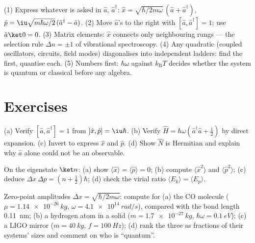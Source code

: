 \begin{method}\label{met:b3:harmonic-oscillator:method}
(1) Express whatever is asked in $\hat a$, $\hat a^\dagger$: $\hat x
= \sqrt{\hbar/2m\omega}\,(\hat a + \hat a^\dagger)$, $\hat p =
\iu\sqrt{m\hbar\omega/2}\,(\hat a^\dagger - \hat a)$. (2) Move
$\hat a$'s to the right with $[\hat a, \hat a^\dagger] = 1$; use
$\hat a\ket0 = 0$. (3) Matrix elements: $\hat x$ connects only
neighbouring rungs --- the selection rule $\Delta n = \pm1$ of
vibrational spectroscopy. (4) Any quadratic  (coupled
oscillators, circuits, field modes) diagonalises into independent
ladders: find the  first, quantise each. (5) Numbers
first: $\hbar\omega$ against $k_{\text{B}}T$ decides whether the
system is quantum or classical before any algebra.
\end{method}

\section{Exercises}

\begin{exercise}[$\star$]\label{exo:b3:harmonic-oscillator:1}
(a) Verify $[\hat a, \hat a^\dagger] = 1$ from $[\hat x, \hat p] =
\iu\hbar$. (b) Verify $\hat H = \hbar\omega(\hat a^\dagger\hat a +
\tfrac12)$ by direct expansion. (c) Invert to express $\hat x$ and
$\hat p$. (d) Show $\hat N$ is Hermitian and explain why $\hat a$
alone could not be an observable.
\end{exercise}

\begin{exercise}[$\star$]\label{exo:b3:harmonic-oscillator:2}
On the eigenstate $\ket n$: (a) show $\langle\hat x\rangle =
\langle\hat p\rangle = 0$; (b) compute $\langle\hat x^2\rangle$ and
$\langle\hat p^2\rangle$; (c) deduce $\Delta x\,\Delta p = (n +
\tfrac12)\hbar$; (d) check the virial ratio $\langle E_k\rangle =
\langle E_p\rangle$.
\end{exercise}

\begin{exercise}[$\star$]\label{exo:b3:harmonic-oscillator:3}
Zero-point amplitudes $\Delta x = \sqrt{\hbar/2m\omega}$: compute
for (a) the CO molecule ($\mu = \qty{1.14e-26}{kg}$, $\omega =
\qty{4.1e14}{rad/s}$), compared with the bond length
\qty{0.11}{nm}; (b) a hydrogen atom in a solid ($m =
\qty{1.7e-27}{kg}$, $\hbar\omega = \qty{0.1}{eV}$); (c) a LIGO
mirror ($m = \qty{40}{kg}$, $f = \qty{100}{Hz}$); (d) rank the three
as fractions of their systems' sizes and comment on who is
``quantum''.
\end{exercise}

